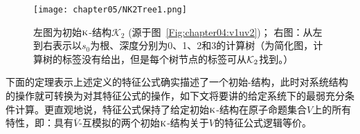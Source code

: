 \begin{example}
	
	
	\begin{figure*}
		\centering
		\texttt{[image: chapter05/NK2Tree1.png]}
		\caption{左图为初始$\textsc{k}$-结构$\mathcal{K}_2$ (源于图~\ref{Fig:chapter04:v1uv2})； 右图：从左到右表示以$s_0$为根、深度分别为0、1、2和3的计算树（为简化图，计算树的标签没有给出，但是每个树节点的标签可从${\cal K}_2$找到。）}\label{fig:K2Tree}
	\end{figure*}


\end{example}


下面的定理表示上述定义的特征公式确实描述了一个初始\MPK-结构，此时对系统结构的操作就可转换为对其特征公式的操作，如下文将要讲的给定系统下的最弱充分条件计算。更直观地说，特征公式保持了给定初始$\textsc{k}$-结构在原子命题集合$V$上的所有特性，即：具有$\overline{V}$-互模拟的两个初始$\textsc{k}$-结构关于$V$的特征公式逻辑等价。

